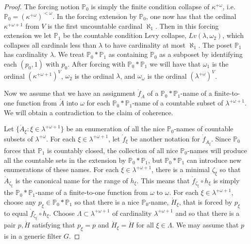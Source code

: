 \documentclass{amsart}
\theoremstyle{plain}
\theoremstyle{definition}
\theoremstyle{remark}
\theoremstyle{plain}
\theoremstyle{definition}
\theoremstyle{remark}
\begin{document}
\begin{proof}
            The forcing notion $\mathbb P_0$ is simply the finite condition
            collapse of $\kappa^{+\omega}$, i.e. $\mathbb P_0 = \left(
             \kappa^{+\omega}\right)^{<\omega}$. In the forcing extension by
             $\mathbb P_0$, one now has that the ordinal $\kappa^{+\omega+1}$
             from $V$ is the first uncountable cardinal $\aleph_1$. Then in this
             forcing extension we let $\mathbb P_1$ be the countable condition
             Levy collapse, $Lv(\lambda,\omega_2)$, which collapses all cardinals
             less than $\lambda$ to have cardinality at most $\aleph_1$. The poset
             $\mathbb P_1$ has cardinality $\lambda$. We treat
            $\mathbb P_0*\mathbb P_1$ as containing $\mathbb P_0$
            as a subposet by identifying each $(p_0,1)$ with $p_0$.
            After forcing with $\mathbb P_0*\mathbb P_1$ we will have
            that $\omega_1$ is the ordinal $\left(\kappa^{+\omega+1}\right)^V$,
             $\omega_2$ is the ordinal $\lambda$, and $\omega_\omega$ is the
             ordinal $\left(\lambda^{+\omega}\right)^V$.





            Now we assume that we have an assignment $\dot f_{\dot A}$ of a
             $\mathbb P_0*\mathbb P_1$-name of a finite-to-one function from
             $\dot A$ into $\omega$ for each
             $\mathbb P_0*\mathbb P_1$-name of a countable subset of
             $\lambda^{+\omega+1}$. We will obtain a contradiction
             to the claim of coherence.

            Let $\{ \dot A_\xi : \xi \in \lambda^{+\omega+1}\}$ be an enumeration
            of all the  nice $\mathbb P_0$-names of countable
            subsets of $\lambda^{+\omega}$. For each $\xi\in \lambda^{+\omega+1}$,
             let $\dot f_\xi$ be another notation for $\dot f_{\dot A_\xi}$.
            Since $\mathbb P_0$ forces that $\mathbb P_1$ is countably closed,
            the collection of all nice  $\mathbb P_0$-names will produce all
            the countable sets in the extension by $\mathbb P_0* \mathbb
            P_1$, but $\mathbb P_0*\mathbb P_1$ can introduce new enumerations of
            these names.
            For each $\xi\in \lambda^{+\omega+1}$,
            there is a minimal $\zeta_\xi$ so that $\dot A_{\zeta_\xi}$ is the
            canonical name for the range of $h_\xi$. This means that
             $\dot f_{\zeta_\xi} \circ h_\xi$ is simply the
             $\mathbb P_0 *\mathbb P_1$-name of a finite-to-one function from
             $\omega$ to $\omega$.
              For each $\xi\in \lambda^{+\omega+1}$,
             choose any $p_\xi \in \mathbb P_0*\mathbb P_1$ so that
             there is a nice $\mathbb P_0$-name, $\dot H_\xi$,
             that is forced by
             $p_\xi$  to equal $\dot f_{\zeta_\xi}\circ h_\xi$.
              Choose $\Lambda\subset \lambda^{+\omega+1}$
              of cardinality $\lambda^{+\omega+1}$
              and so that there is a pair $p,\dot H$
              satisfying that $p_\xi = p$ and $\dot H_\xi = \dot H$
              for all $\xi\in \Lambda$. We may assume that $p$
              is in a generic filter $  G$.



\end{proof}
\end{document}
